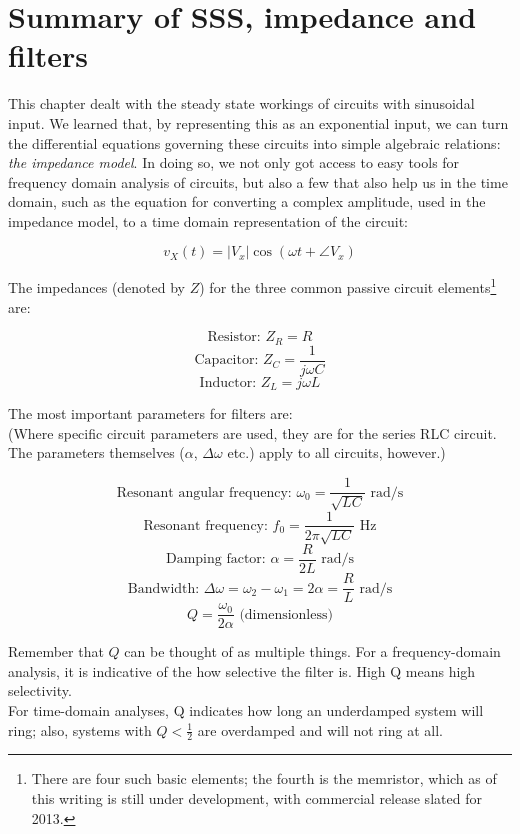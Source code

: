 \documentclass[12pt,a4paper]{report}
\begin{document}
\newpage

\section{Summary of SSS, impedance and filters}
This chapter dealt with the steady state workings of circuits with sinusoidal input. We learned that, by representing this as an exponential input, we can turn the differential equations governing these circuits into simple algebraic relations: \emph{the impedance model}. In doing so, we not only got access to easy tools for frequency domain analysis of circuits, but also a few that also help us in the time domain, such as the equation for converting a complex amplitude, used in the impedance model, to a time domain representation of the circuit:

\[ v_X(t) = |V_x| \cos{(\omega t + \angle V_x)} \]

The impedances (denoted by $Z$) for the three common passive circuit elements\footnote{There are four such basic elements; the fourth is the memristor, which as of this writing is still under development, with commercial release slated for 2013.} are:

\[ \text{Resistor: } Z_R = R \]
\[ \text{Capacitor: } Z_C = \frac{1}{j\omega C} \]
\[ \text{Inductor: } Z_L = j\omega L \]

The most important parameters for filters are:\\
(Where specific circuit parameters are used, they are for the series RLC circuit. The parameters themselves ($\alpha$, $\Delta \omega$ etc.) apply to all circuits, however.)

\[ \text{Resonant angular frequency: } \omega_0 = \frac{1}{\sqrt{LC}} \text{ rad/s} \]
\[ \text{Resonant frequency: } f_0 = \frac{1}{2\pi \sqrt{LC}} \text { Hz} \]
\[ \text{Damping factor: } \alpha = \frac{R}{2 L} \text{ rad/s} \]
\[ \text{Bandwidth: } \Delta \omega = \omega_2 - \omega_1 = 2 \alpha = \frac{R}{L} \text { rad/s} \]
\[ Q = \frac{\omega_0}{2 \alpha} \text{ (dimensionless)} \]

Remember that $Q$ can be thought of as multiple things. For a frequency-domain analysis, it is indicative of the how selective the filter is. High Q means high selectivity.\\
For time-domain analyses, Q indicates how long an underdamped system will ring; also, systems with $\displaystyle Q < \frac{1}{2}$ are overdamped and will not ring at all.

\end{document}
